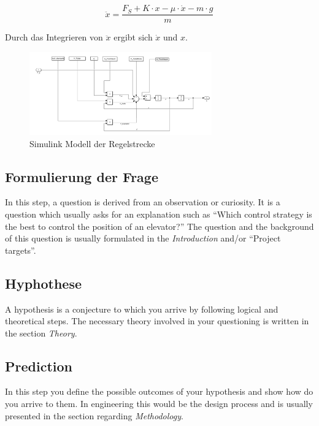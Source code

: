 	\begin{equation}
		\ddot{x} = \frac{F_{S} + K \cdot x - \mu \cdot \dot{x} - m \cdot g}{m}
		\label{eq:DifferenzengleichungAufgeloest}
	\end{equation}

	Durch das Integrieren von $\ddot{x}$ ergibt sich $\dot{x}$ und $x$.

	\begin{figure}[h] 
		\centering
		   \includegraphics[width=0.7\textwidth]{Bilder/SimulinkStreckenModell.PNG}
		\caption{Simulink Modell der Regelstrecke}
		\label{SimulinkStreckenModell}
	  \end{figure}
	
	\subsection{Formulierung der Frage}
	
	In this step, a question is derived from an observation or curiosity. It is a question which usually asks for an explanation such as ``Which control strategy is the best to control the position of an elevator?'' The question and the background of this question is usually formulated in the \emph{Introduction} and/or ``Project targets''.
	
	\subsection{Hyphothese}
	
	A hypothesis is a conjecture to which you arrive by following logical and theoretical steps. The necessary theory involved in your questioning is written in the section \emph{Theory}.
	
	\subsection{Prediction}
	
	In this step you define the possible outcomes of your hypothesis and show how do you arrive to them. In engineering this would be the design process and is usually presented in the section regarding \emph{Methodology}.
	
